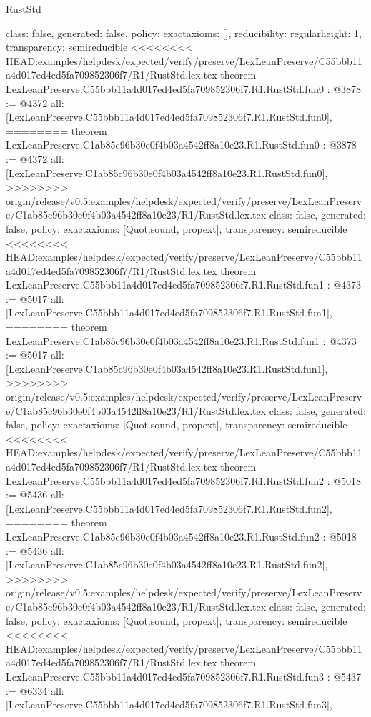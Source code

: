 \begin{lexlean}{RustStd}
\begin{coremodule}
{\begin{coremodule}
{{{  class: false,
  generated: false,
  policy: exact{axioms: []},
  reducibility: regular{height: 1},
  transparency: semireducible
}
<<<<<<<< HEAD:examples/helpdesk/expected/verify/preserve/LexLeanPreserve/C55bbb11a4d017ed4ed5fa709852306f7/R1/RustStd.lex.tex
theorem LexLeanPreserve.C55bbb11a4d017ed4ed5fa709852306f7.R1.RustStd.fun0 : @3878 := @4372 {
  all: [LexLeanPreserve.C55bbb11a4d017ed4ed5fa709852306f7.R1.RustStd.fun0],
========
theorem LexLeanPreserve.C1ab85c96b30e0f4b03a4542ff8a10e23.R1.RustStd.fun0 : @3878 := @4372 {
  all: [LexLeanPreserve.C1ab85c96b30e0f4b03a4542ff8a10e23.R1.RustStd.fun0],
>>>>>>>> origin/release/v0.5:examples/helpdesk/expected/verify/preserve/LexLeanPreserve/C1ab85c96b30e0f4b03a4542ff8a10e23/R1/RustStd.lex.tex
  class: false,
  generated: false,
  policy: exact{axioms: [Quot.sound, propext]},
  transparency: semireducible
}
<<<<<<<< HEAD:examples/helpdesk/expected/verify/preserve/LexLeanPreserve/C55bbb11a4d017ed4ed5fa709852306f7/R1/RustStd.lex.tex
theorem LexLeanPreserve.C55bbb11a4d017ed4ed5fa709852306f7.R1.RustStd.fun1 : @4373 := @5017 {
  all: [LexLeanPreserve.C55bbb11a4d017ed4ed5fa709852306f7.R1.RustStd.fun1],
========
theorem LexLeanPreserve.C1ab85c96b30e0f4b03a4542ff8a10e23.R1.RustStd.fun1 : @4373 := @5017 {
  all: [LexLeanPreserve.C1ab85c96b30e0f4b03a4542ff8a10e23.R1.RustStd.fun1],
>>>>>>>> origin/release/v0.5:examples/helpdesk/expected/verify/preserve/LexLeanPreserve/C1ab85c96b30e0f4b03a4542ff8a10e23/R1/RustStd.lex.tex
  class: false,
  generated: false,
  policy: exact{axioms: [Quot.sound, propext]},
  transparency: semireducible
}
<<<<<<<< HEAD:examples/helpdesk/expected/verify/preserve/LexLeanPreserve/C55bbb11a4d017ed4ed5fa709852306f7/R1/RustStd.lex.tex
theorem LexLeanPreserve.C55bbb11a4d017ed4ed5fa709852306f7.R1.RustStd.fun2 : @5018 := @5436 {
  all: [LexLeanPreserve.C55bbb11a4d017ed4ed5fa709852306f7.R1.RustStd.fun2],
========
theorem LexLeanPreserve.C1ab85c96b30e0f4b03a4542ff8a10e23.R1.RustStd.fun2 : @5018 := @5436 {
  all: [LexLeanPreserve.C1ab85c96b30e0f4b03a4542ff8a10e23.R1.RustStd.fun2],
>>>>>>>> origin/release/v0.5:examples/helpdesk/expected/verify/preserve/LexLeanPreserve/C1ab85c96b30e0f4b03a4542ff8a10e23/R1/RustStd.lex.tex
  class: false,
  generated: false,
  policy: exact{axioms: [Quot.sound, propext]},
  transparency: semireducible
}
<<<<<<<< HEAD:examples/helpdesk/expected/verify/preserve/LexLeanPreserve/C55bbb11a4d017ed4ed5fa709852306f7/R1/RustStd.lex.tex
theorem LexLeanPreserve.C55bbb11a4d017ed4ed5fa709852306f7.R1.RustStd.fun3 : @5437 := @6334 {
  all: [LexLeanPreserve.C55bbb11a4d017ed4ed5fa709852306f7.R1.RustStd.fun3],
}}}}}}
\end{coremodule}}
\end{coremodule}
\end{lexlean}
